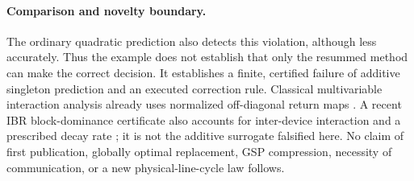 \paragraph{Comparison and novelty boundary.}
The ordinary quadratic prediction also detects this violation, although less
accurately. Thus the example does not establish that only the resummed method
can make the correct decision. It establishes a finite, certified failure
of additive singleton prediction and an executed correction rule.
Classical multivariable interaction analysis already uses normalized
off-diagonal return maps \cite{grosdidier}. A recent IBR block-dominance
certificate also accounts for inter-device interaction and a prescribed
decay rate \cite{chenbdd}; it is not the additive surrogate falsified here.
No claim of first publication, globally optimal replacement, GSP compression,
necessity of communication, or a new physical-line-cycle law follows.
